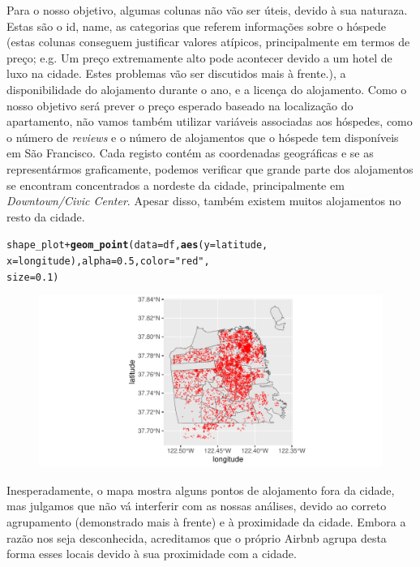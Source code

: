 \documentclass[justified, 11pt]{scrartcl}\usepackage[]{graphicx}\usepackage[]{xcolor}
\makeatletter
\def\maxwidth{ %
  \ifdim\Gin@nat@width>\linewidth
    \linewidth
  \else
    \Gin@nat@width
  \fi
}
\newcommand{\hlnum}[1]{\textcolor[rgb]{0.686,0.059,0.569}{#1}}%
\newcommand{\hlstr}[1]{\textcolor[rgb]{0.192,0.494,0.8}{#1}}%
\newcommand{\hlopt}[1]{\textcolor[rgb]{0,0,0}{#1}}%
\newcommand{\hlstd}[1]{\textcolor[rgb]{0.345,0.345,0.345}{#1}}%
\newcommand{\hlkwc}[1]{\textcolor[rgb]{0.333,0.667,0.333}{#1}}%
\newcommand{\hlkwd}[1]{\textcolor[rgb]{0.737,0.353,0.396}{\textbf{#1}}}%
\newenvironment{kframe}{%
 \def\at@end@of@kframe{}%
 \ifinner\ifhmode%
  \def\at@end@of@kframe{\end{minipage}}%
  \begin{minipage}{\columnwidth}%
 \fi\fi%
 \def\FrameCommand##1{\hskip\@totalleftmargin \hskip-\fboxsep
 \colorbox{shadecolor}{##1}\hskip-\fboxsep
     \hskip-\linewidth \hskip-\@totalleftmargin \hskip\columnwidth}%
 \MakeFramed {\advance\hsize-\width
   \@totalleftmargin\z@ \linewidth\hsize
   \@setminipage}}%
 {\par\unskip\endMakeFramed%
 \at@end@of@kframe}
\newenvironment{knitrout}{}{} %
\makeatother
\begin{document}
Para o nosso objetivo, algumas colunas não vão ser úteis, devido à sua naturaza. Estas são o id, name, as categorias que referem informações sobre o hóspede (estas colunas conseguem justificar valores atípicos, principalmente em termos de preço; e.g. Um preço extremamente alto pode acontecer devido a um hotel de luxo na cidade. Estes problemas vão ser discutidos mais à frente.), a disponibilidade do alojamento durante o ano, e a licença do alojamento. Como o nosso objetivo será prever o preço esperado baseado na localização do apartamento, não vamos também utilizar variáveis associadas aos hóspedes, como o número de \textit{reviews} e o número de alojamentos que o hóspede tem disponíveis em São Francisco. 
Cada registo contém as coordenadas geográficas e se as representármos graficamente, podemos verificar que grande parte dos alojamentos se encontram concentrados a nordeste da cidade, principalmente em \textit{Downtown/Civic Center}. Apesar disso, também existem muitos alojamentos no resto da cidade.
\begin{knitrout}
\color{fgcolor}\begin{kframe}
\begin{alltt}
\hlstd{shape_plot} \hlopt{+} \hlkwd{geom_point}\hlstd{(}\hlkwc{data} \hlstd{= df,} \hlkwd{aes}\hlstd{(}\hlkwc{y} \hlstd{= latitude,}
    \hlkwc{x} \hlstd{= longitude),} \hlkwc{alpha} \hlstd{=} \hlnum{0.5}\hlstd{,} \hlkwc{color} \hlstd{=} \hlstr{"red"}\hlstd{,}
    \hlkwc{size} \hlstd{=} \hlnum{0.1}\hlstd{)}
\end{alltt}
\end{kframe}\begin{figure}
\includegraphics[width=\maxwidth]{figure/chunk-plotPlace-1} \end{figure}

\end{knitrout}
Inesperadamente, o mapa mostra alguns pontos de alojamento fora da cidade, mas julgamos que não vá interferir com as nossas análises, devido ao correto agrupamento (demonstrado mais à frente) e à proximidade da cidade. Embora a razão nos seja desconhecida, acreditamos que o próprio Airbnb agrupa desta forma esses locais devido à sua proximidade com a cidade. \\
\end{document}
